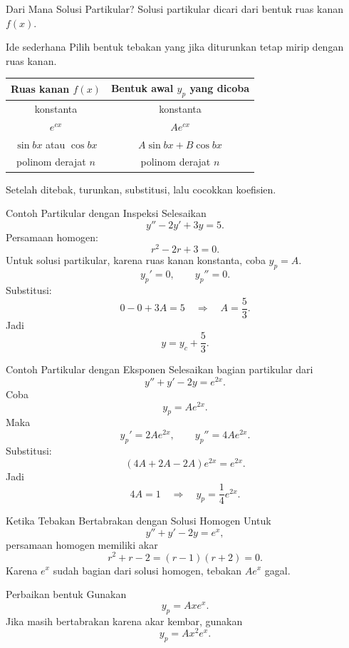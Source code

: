 \documentclass[aspectratio=169,11pt]{beamer}
\begin{document}
\begin{frame}{Dari Mana Solusi Partikular?}
Solusi partikular dicari dari bentuk ruas kanan $f(x)$.
\begin{block}{Ide sederhana}
Pilih bentuk tebakan yang jika diturunkan tetap mirip dengan ruas kanan.
\end{block}
\begin{center}
\begin{tabular}{c c}
\toprule
Ruas kanan $f(x)$ & Bentuk awal $y_p$ yang dicoba \\
\midrule
konstanta & konstanta \\
$e^{cx}$ & $Ae^{cx}$ \\
$\sin bx$ atau $\cos bx$ & $A\sin bx+B\cos bx$ \\
polinom derajat $n$ & polinom derajat $n$ \\
\bottomrule
\end{tabular}
\end{center}
Setelah ditebak, turunkan, substitusi, lalu cocokkan koefisien.
\end{frame}

\begin{frame}{Contoh Partikular dengan Inspeksi}
Selesaikan
\[
y''-2y'+3y=5.
\]
Persamaan homogen:
\[
r^2-2r+3=0.
\]
Untuk solusi partikular, karena ruas kanan konstanta, coba $y_p=A$.
\[
y_p'=0,\qquad y_p''=0.
\]
Substitusi:
\[
0-0+3A=5 \quad \Rightarrow \quad A=\frac{5}{3}.
\]
Jadi
\[
y=y_c+\frac{5}{3}.
\]
\end{frame}

\begin{frame}{Contoh Partikular dengan Eksponen}
Selesaikan bagian partikular dari
\[
y''+y'-2y=e^{2x}.
\]
Coba
\[
y_p=Ae^{2x}.
\]
Maka
\[
y_p'=2Ae^{2x},\qquad y_p''=4Ae^{2x}.
\]
Substitusi:
\[
(4A+2A-2A)e^{2x}=e^{2x}.
\]
Jadi
\[
4A=1 \quad \Rightarrow \quad y_p=\frac14 e^{2x}.
\]
\end{frame}

\begin{frame}{Ketika Tebakan Bertabrakan dengan Solusi Homogen}
Untuk
\[
y''+y'-2y=e^x,
\]
persamaan homogen memiliki akar
\[
r^2+r-2=(r-1)(r+2)=0.
\]
Karena $e^x$ sudah bagian dari solusi homogen, tebakan $Ae^x$ gagal.
\begin{alertblock}{Perbaikan bentuk}
Gunakan
\[
y_p=Axe^x.
\]
Jika masih bertabrakan karena akar kembar, gunakan
\[
y_p=Ax^2e^x.
\]
\end{alertblock}
\end{frame}
\end{document}
